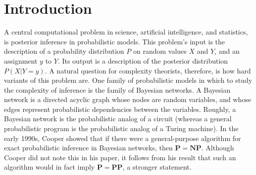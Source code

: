 \documentclass{article}
\renewcommand{\P}{\mathbf{P}}
\newcommand{\NP}{\mathbf{NP}}
\def \PP{\P\P}
\theoremstyle{definition}
\theoremstyle{remark}
\begin{document}
\section{Introduction}
A central computational problem in science, artificial intelligence, and statistics, is posterior inference in probabilistic models.
This problem's input is the description of a probability distribution $P$ on random values $X$ and $Y$, and an assignment $y$ to $Y$.
Its output is a description of the posterior distribution $P(X | Y = y)$.
A natural question for complexity theorists, therefore, is how hard variants of this problem are.
One family of probabilistic models in which to study the complexity of inference is the family of Bayesian networks.
A Bayesian network is a directed acyclic graph whose nodes are random variables, and whose edges represent probabilistic dependencies between the variables.
Roughly, a Bayesian network is the probabilistic analog of a circuit (whereas a general probabilistic program \cite{mansinghka2009natively} is the probabilistic analog of a Turing machine).
In the early 1990s, Cooper \cite{cooper1990} showed that if there were a general-purpose algorithm for exact probabilistic inference in Bayesian networks, then $\P = \NP$.
Although Cooper did not note this in his paper, it follows from his result that such an algorithm would in fact imply $\P = \PP$, a stronger statement.
\end{document}
